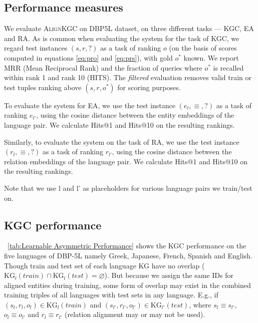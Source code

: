 \documentclass[11pt]{article}
\def\En{\ensuremath{\text{En}}}
\def\Fr{\ensuremath{\text{Fr}}}
\def\KG{\ensuremath{\text{KG}}}
\def\shortname{\textsc{Align\-KGC}}
\begin{document}
\subsection{Performance measures}
 
We evaluate \shortname{} on DBP5L dataset, on three different tasks --- KGC, EA and RA. As is common when evaluating the system for the task of KGC, we regard test instances $(s,r,?)$  as a task of ranking $o$ (on the basis of scores computed in equations \eqref{eq:pro} and \eqref{eq:prs}), with gold $o^*$ known. We report MRR (Mean Reciprocal Rank) and the fraction of queries where $o^*$ is recalled within rank 1 and rank 10 (HITS). The \emph{filtered} evaluation removes valid train or test tuples ranking above $(s,r,o^*)$ for scoring purposes.



To evaluate the system for EA, we use the test instance  $(e_{l}, \equiv, ?)$ as a task of ranking $e_{l'}$, using the cosine distance between the entity embeddings of the language pair. We calculate Hits@1 and Hits@10 on the resulting rankings.

\iffalse
we use half of seed alignments not used while training to get aligned entity pairs $(e,e')$ where $e \in \KG_{l}$ and $e' \in \KG_{l'}$.  Now we ask the equivalence query $(e_{l}, ?e_{l})$ and rank all entities in $\KG_{l'}$ using cosine similarity.  We calculate Hits@1 and Hits@10 on the resulting rankings.
\fi

Similarly, to evaluate the system on the task of RA, we use the test instance  $(r_{l}, \equiv, ?)$ as a task of ranking $r_{l'}$, using the cosine distance between the relation embeddings of the language pair. We calculate Hits@1 and Hits@10 on the resulting rankings.

Note that we use l and l' as placeholders for various language pairs we train/test on.
\iffalse
we have relation alignment on queries $(r_\En, ?r_\Fr)$ and rank relations using cosine similarity. We calculate Hits@1 and Hits@3.  Because relation candidates are far fewer in number, Hits@10 is not a reliable measure for RA.
\fi
 


\subsection{KGC performance}

\tablename~\ref{tab:Learnable Asymmetric Performance} shows the KGC performance on the five languages of DBP-5L namely Greek, Japanese, French, Spanish and English.
Though train and test set of each language KG have no overlap ($\KG_{l}(train) \cap \KG_{l}(test) = \varnothing$). 
But because we assign the same IDs for aligned entities during training, some form of overlap may exist in the combined training triples of all languages with test sets in any language.  E.g.,  if $(s_{l},r_{l},o_{l}) \in \KG_{l}(train)$ and $(s_{l'},r_{l'},o_{l'}) \in \KG_{l'}(test)$, where $s_{l} \equiv s_{l'}$, $o_{l} \equiv o_{l'}$ and $r_{l} \equiv r_{l'}$ (relation alignment may or may not be used).
\end{document}
